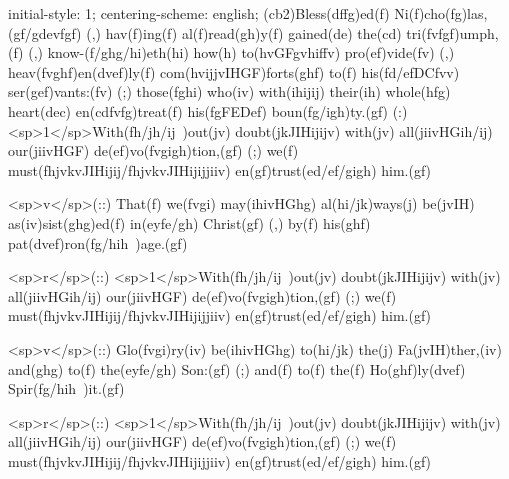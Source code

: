 initial-style: 1;
centering-scheme: english;
(cb2)Bless(dffg)ed(f) Ni(f)cho(fg)las,(gf/gdevfgf) (,) hav(f)ing(f) al(f)read(gh)y(f) gained(de) the(cd) tri(fvfgf)umph,(f) (,) know-(f/ghg/hi)eth(hi) how(h) to(hvGFgvhiffv) pro(ef)vide(fv) (,) heav(fvghf)en(dvef)ly(f) com(hvijjvIHGF)forts(ghf) to(f) his(fd/efDCfvv) ser(gef)vants:(fv) (;) those(fghi) who(iv) with(ihijij) their(ih) whole(hfg) heart(dec) en(cdfvfg)treat(f) his(fgFEDef) boun(fg/igh)ty.(gf) (:) <sp>1</sp>With(fh/jh/ij~)out(jv) doubt(jkJIHijijv) with(jv) all(jiivHGih/ij) our(jiivHGF) de(ef)vo(fvgigh)tion,(gf) (;) we(f) must(fhjvkvJIHijij/fhjvkvJIHijijjiiv) en(gf)trust(ed/ef/gigh) him.(gf)

<sp>v</sp>(::) That(f) we(fvgi) may(ihivHGhg) al(hi/jk)ways(j) be(jvIH) as(iv)sist(ghg)ed(f) in(eyfe/gh) Christ(gf) (,) by(f) his(ghf) pat(dvef)ron(fg/hih~)age.(gf)

<sp>r</sp>(::) <sp>1</sp>With(fh/jh/ij~)out(jv) doubt(jkJIHijijv) with(jv) all(jiivHGih/ij) our(jiivHGF) de(ef)vo(fvgigh)tion,(gf) (;) we(f) must(fhjvkvJIHijij/fhjvkvJIHijijjiiv) en(gf)trust(ed/ef/gigh) him.(gf)

<sp>v</sp>(::) Glo(fvgi)ry(iv) be(ihivHGhg) to(hi/jk) the(j) Fa(jvIH)ther,(iv) and(ghg) to(f) the(eyfe/gh) Son:(gf) (;) and(f) to(f) the(f) Ho(ghf)ly(dvef) Spir(fg/hih~)it.(gf)

<sp>r</sp>(::) <sp>1</sp>With(fh/jh/ij~)out(jv) doubt(jkJIHijijv) with(jv) all(jiivHGih/ij) our(jiivHGF) de(ef)vo(fvgigh)tion,(gf) (;) we(f) must(fhjvkvJIHijij/fhjvkvJIHijijjiiv) en(gf)trust(ed/ef/gigh) him.(gf)